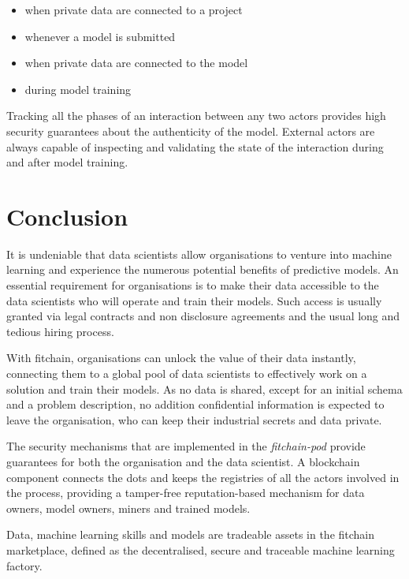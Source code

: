 \documentclass[12pt, a4paper,titlepage]{extreport}
\begin{document}
\begin{itemize}
\item when private data are connected to a project
\item whenever a model is submitted
\item when private data are connected to the model 
\item during model training 
\end{itemize}

Tracking all the phases of an interaction between any two actors provides high security guarantees about the authenticity of the model. External actors are always capable of inspecting and validating the state of the interaction during and after model training.


\pagebreak
\section{Conclusion}
It is undeniable that data scientists allow organisations to venture into machine learning and experience the numerous potential benefits of predictive models. An essential requirement for organisations is to make their data accessible to the data scientists who will operate and train their models. Such access is usually granted via legal contracts and non disclosure agreements and the usual long and tedious hiring process. 

With fitchain, organisations can unlock the value of their data instantly, connecting them to a global pool of data scientists to effectively work on a solution and train their models. As no data is shared, except for an initial schema and a problem description, no addition confidential information is expected to leave the organisation, who can keep their industrial secrets and data private.

The security mechanisms that are implemented in the \textit{fitchain-pod} provide guarantees for both the organisation and the data scientist. A blockchain component connects the dots and keeps the registries of all the actors involved in the process, providing a tamper-free reputation-based mechanism for data owners, model owners, miners and trained models.

Data, machine learning skills and models are tradeable assets in the fitchain marketplace, defined as the decentralised, secure and traceable machine learning factory.




\end{document}
